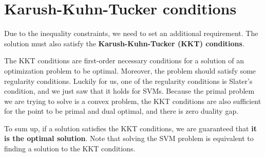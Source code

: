 \section{Karush-Kuhn-Tucker conditions }
\label{sec:kkt_condition}
Due to the inequality constraints, we need to set an additional requirement. The solution must also satisfy the \textbf{Karush-Kuhn-Tucker (KKT) conditions}. 

The KKT conditions are first-order necessary conditions for a solution of an optimization problem to be optimal. Moreover, the problem should satisfy some regularity conditions. Luckily for us, one of the regularity conditions is Slater’s condition, and we just saw that it holds for SVMs. Because the primal problem we are trying to solve is a convex problem, the KKT conditions are also sufficient for the point to be primal and dual optimal, and there is zero duality gap. 

To sum up, if a solution satisfies the KKT conditions, we are guaranteed that \textbf{it is the optimal solution}. Note that solving the SVM problem is equivalent to finding a solution to the KKT conditions. 




